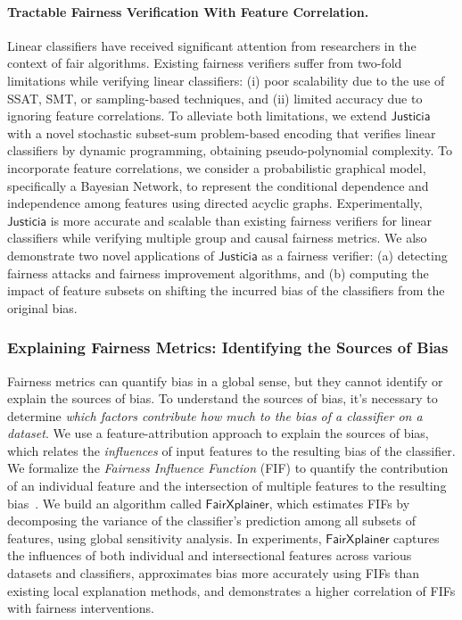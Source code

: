 \documentclass{article}
\begin{document}
\paragraph{Tractable Fairness Verification With Feature Correlation.} Linear classifiers have received significant attention from researchers in the context of fair algorithms. Existing fairness verifiers suffer from two-fold limitations while verifying linear classifiers: (i) poor scalability due to the use of SSAT, SMT, or sampling-based techniques, and (ii) limited accuracy due to ignoring feature correlations. To alleviate both limitations, we extend $\mathsf{Justicia}$ with a novel stochastic subset-sum problem-based encoding that verifies linear classifiers by dynamic programming, obtaining pseudo-polynomial complexity. To incorporate feature correlations, we consider a probabilistic graphical model, specifically a Bayesian Network, to represent the conditional dependence and independence among features using directed acyclic graphs. Experimentally, $\mathsf{Justicia}$ is more accurate and scalable than existing fairness verifiers for linear classifiers while verifying multiple group and causal fairness metrics. We also demonstrate two novel applications of $\mathsf{Justicia}$ as a fairness verifier: (a) detecting fairness attacks and fairness improvement algorithms, and (b) computing the impact of feature subsets on shifting the incurred bias of the classifiers from the original bias.






\subsubsection*{Explaining Fairness Metrics: Identifying the Sources of Bias}
Fairness metrics can quantify bias in a global sense, but they cannot identify or explain the sources of bias. To understand the sources of bias, it's necessary to determine \textit{which factors contribute how much to the bias of a classifier on a dataset}. We use a feature-attribution approach to explain the sources of bias, which relates the \emph{influences} of input features to the resulting bias of the classifier. We formalize the \textit{Fairness Influence Function} (FIF) to quantify the contribution of an individual feature and the intersection of multiple features to the resulting bias~\cite{ghosh2022how}. We build an algorithm called $\mathsf{FairXplainer}$, which estimates FIFs by decomposing the variance of the classifier's prediction among all subsets of features, using global sensitivity analysis. In experiments, $\mathsf{FairXplainer}$ captures the influences of both individual and intersectional features across various datasets and classifiers, approximates bias more accurately using FIFs than existing local explanation methods, and demonstrates a higher correlation of FIFs with fairness interventions.






\end{document}
